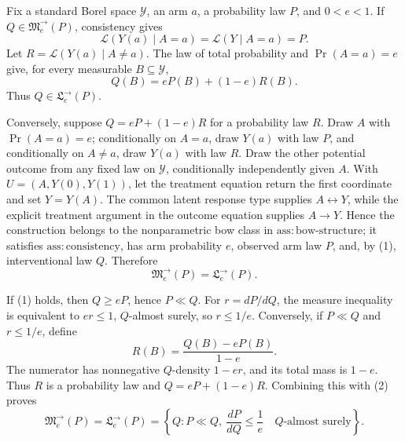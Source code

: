 Fix a standard Borel space \(\mathcal Y\), an arm \(a\), a probability law \(P\), and \(0<e<1\).  If \(Q\in\mathfrak M^{\to}_e(P)\), consistency gives
\[
 \mathcal L(Y(a)\mid A=a)=\mathcal L(Y\mid A=a)=P.
\]
Let \(R=\mathcal L(Y(a)\mid A\ne a)\).  The law of total probability and \(\Pr(A=a)=e\) give, for every measurable \(B\subseteq\mathcal Y\),
\[
 Q(B)=eP(B)+(1-e)R(B). \tag{1}
\]
Thus \(Q\in\mathfrak L^{\to}_e(P)\).

Conversely, suppose \(Q=eP+(1-e)R\) for a probability law \(R\).  Draw \(A\) with \(\Pr(A=a)=e\); conditionally on \(A=a\), draw \(Y(a)\) with law \(P\), and conditionally on \(A\ne a\), draw \(Y(a)\) with law \(R\).  Draw the other potential outcome from any fixed law on \(\mathcal Y\), conditionally independently given \(A\).  With \(U=(A,Y(0),Y(1))\), let the treatment equation return the first coordinate and set \(Y=Y(A)\).  The common latent response type supplies \(A\leftrightarrow Y\), while the explicit treatment argument in the outcome equation supplies \(A\to Y\).  Hence the construction belongs to the nonparametric bow class in \(\mathrm{ass:bow\text{-}structure}\); it satisfies \(\mathrm{ass:consistency}\), has arm probability \(e\), observed arm law \(P\), and, by (1), interventional law \(Q\).  Therefore
\[
 \mathfrak M^{\to}_e(P)=\mathfrak L^{\to}_e(P). \tag{2}
\]

If (1) holds, then \(Q\ge eP\), hence \(P\ll Q\).  For \(r=dP/dQ\), the measure inequality is equivalent to \(er\le1\), \(Q\)-almost surely, so \(r\le1/e\).  Conversely, if \(P\ll Q\) and \(r\le1/e\), define
\[
 R(B)=\frac{Q(B)-eP(B)}{1-e}.
\]
The numerator has nonnegative \(Q\)-density \(1-er\), and its total mass is \(1-e\).  Thus \(R\) is a probability law and \(Q=eP+(1-e)R\).  Combining this with (2) proves
\[
 \mathfrak M^{\to}_e(P)=\mathfrak L^{\to}_e(P)
 =\left\{Q:P\ll Q,\ \frac{dP}{dQ}\le\frac1e\quad Q\text{-almost surely}\right\}.
\]